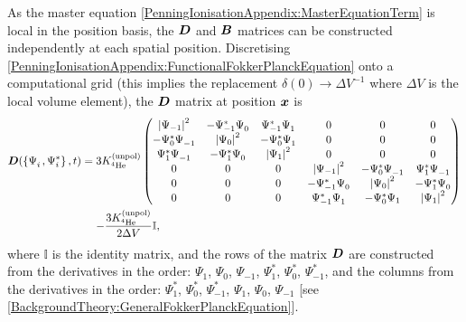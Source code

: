As the master equation \eqref{PenningIonisationAppendix:MasterEquationTerm} is local in the position basis, the $\bm{D}$ and $\bm{B}$ matrices can be constructed independently at each spatial position. Discretising \eqref{PenningIonisationAppendix:FunctionalFokkerPlanckEquation} onto a computational grid (this implies the replacement $\delta(0) \rightarrow \Delta V^{-1}$ where $\Delta V$ is the local volume element), the $\bm{D}$ matrix at position $\bm{x}$ is
\begin{align}
    \begin{split}
        \vect{D}(\left\{ \Psi_i^{\phantom{*}}, \Psi_i^* \right\}, t) &= 3 \Kunpol
        \begin{pmatrix}
            \abs{\Psi_{-1}}^2 & - \Psi_{-1}^* \Psi_0^{\phantom{*}} & \Psi_{-1}^* \Psi_{1}^{\phantom{*}} & 0 & 0 & 0 \\
            - \Psi_{0}^* \Psi_{-1}^{\phantom{*}} & \abs{\Psi_{0}}^2 & - \Psi_{0}^*\Psi_1^{\phantom{*}} & 0 & 0 & 0 \\
            \Psi_{1}^* \Psi_{-1}^{\phantom{*}} & - \Psi_{1}^* \Psi_0^{\phantom{*}} & \abs{\Psi_{1}}^2  & 0 & 0 & 0 \\
            0 & 0 & 0 & \abs{\Psi_{-1}}^2 & - \Psi_{0}^* \Psi_{-1}^{\phantom{*}} & \Psi_{1}^* \Psi_{-1}^{\phantom{*}} \\
            0 & 0 & 0 & - \Psi_{-1}^* \Psi_0^{\phantom{*}} & \abs{\Psi_{0}}^2 & - \Psi_{1}^* \Psi_0^{\phantom{*}} \\
            0 & 0 & 0 & \Psi_{-1}^* \Psi_{1}^{\phantom{*}} & - \Psi_0^* \Psi_1 & \abs{\Psi_1}^2
        \end{pmatrix}\\
        &\relphantom{=}- \frac{3 \Kunpol}{2 \Delta V} \mathbb{I},
    \end{split}
    \label{PenningIonisationAppendix:DMatrix}
\end{align}
where $\mathbb{I}$ is the identity matrix, and the rows of the matrix $\bm{D}$ are constructed from the derivatives in the order: $\Psi_1^{\phantom{*}}$, $\Psi_0^{\phantom{*}}$, $\Psi_{-1}^{\phantom{*}}$, $\Psi_1^*$, $\Psi_0^*$, $\Psi_{-1}^*$, and the columns from the derivatives in the order: $\Psi_1^*$, $\Psi_0^*$, $\Psi_{-1}^*$, $\Psi_1^{\phantom{*}}$, $\Psi_0^{\phantom{*}}$, $\Psi_{-1}^{\phantom{*}}$ [see \eqref{BackgroundTheory:GeneralFokkerPlanckEquation}].

